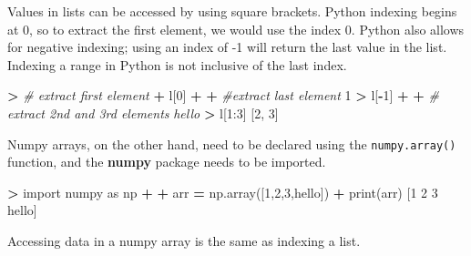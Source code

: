 \documentclass[
]{book}
\newenvironment{Shaded}{\begin{snugshade}}{\end{snugshade}}
\newcommand{\BuiltInTok}[1]{#1}
\newcommand{\CommentTok}[1]{\textcolor[rgb]{0.56,0.35,0.01}{\textit{#1}}}
\newcommand{\DecValTok}[1]{\textcolor[rgb]{0.00,0.00,0.81}{#1}}
\newcommand{\ImportTok}[1]{#1}
\newcommand{\NormalTok}[1]{#1}
\newcommand{\OperatorTok}[1]{\textcolor[rgb]{0.81,0.36,0.00}{\textbf{#1}}}
\newcommand{\StringTok}[1]{\textcolor[rgb]{0.31,0.60,0.02}{#1}}
\begin{document}
Values in lists can be accessed by using square brackets. Python indexing begins at 0, so to extract the first element, we would use the index 0. Python also allows for negative indexing; using an index of -1 will return the last value in the list. Indexing a range in Python is not inclusive of the last index.

\begin{Shaded}
\begin{Highlighting}[]
\OperatorTok{\textgreater{}} \CommentTok{\# extract first element}
\OperatorTok{+}\NormalTok{ l[}\DecValTok{0}\NormalTok{]}
\OperatorTok{+} 
\OperatorTok{+} \CommentTok{\#extract last element}
\DecValTok{1}
\OperatorTok{\textgreater{}}\NormalTok{ l[}\OperatorTok{{-}}\DecValTok{1}\NormalTok{]}
\OperatorTok{+} 
\OperatorTok{+} \CommentTok{\# extract 2nd and 3rd elements}
\CommentTok{\textquotesingle{}hello\textquotesingle{}}
\OperatorTok{\textgreater{}}\NormalTok{ l[}\DecValTok{1}\NormalTok{:}\DecValTok{3}\NormalTok{]}
\NormalTok{[}\DecValTok{2}\NormalTok{, }\DecValTok{3}\NormalTok{]}
\end{Highlighting}
\end{Shaded}

Numpy arrays, on the other hand, need to be declared using the \texttt{numpy.array()} function, and the \textbf{numpy} package needs to be imported.

\begin{Shaded}
\begin{Highlighting}[]
\OperatorTok{\textgreater{}} \ImportTok{import}\NormalTok{ numpy }\ImportTok{as}\NormalTok{ np}
\OperatorTok{+} 
\OperatorTok{+}\NormalTok{ arr }\OperatorTok{=}\NormalTok{ np.array([}\DecValTok{1}\NormalTok{,}\DecValTok{2}\NormalTok{,}\DecValTok{3}\NormalTok{,}\StringTok{\textquotesingle{}hello\textquotesingle{}}\NormalTok{])}
\OperatorTok{+} \BuiltInTok{print}\NormalTok{(arr)}
\NormalTok{[}\StringTok{\textquotesingle{}1\textquotesingle{}} \StringTok{\textquotesingle{}2\textquotesingle{}} \StringTok{\textquotesingle{}3\textquotesingle{}} \StringTok{\textquotesingle{}hello\textquotesingle{}}\NormalTok{]}
\end{Highlighting}
\end{Shaded}

Accessing data in a numpy array is the same as indexing a list.
\end{document}
